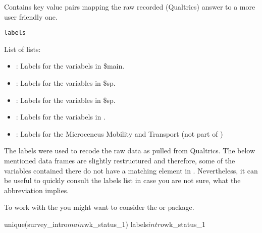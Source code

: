 %
\begin{Description}
Contains key value pairs mapping the raw recorded (Qualtrics) answer to a more
user friendly one.
\end{Description}
%
\begin{Usage}
\begin{verbatim}
labels
\end{verbatim}
\end{Usage}
%
\begin{Format}
List of lists:
\begin{itemize}

\item{} : Labels for the variabels in \$main.
\item{} : Labels for the variables in \$sp.
\item{} : Labels for the variables in \$sp.
\item{} : Labels for the variabels in .
\item{} : Labels for the Microcencus Mobility and Transport (not part of )

\end{itemize}

\end{Format}
%
\begin{Details}
The labels were used to recode the raw data as pulled from Qualtrics. The below
mentioned data frames are slightly restructured and therefore, some of the variables
contained there do not have a matching element in . Nevertheless, it
can be useful to quickly consult the labels list in case you are not sure, what
the abbreviation implies.

To work with the  you might want to consider the  \citep{Heimgartner:2024} or  \citep{Good:2024} package.
\end{Details}
%
\begin{References}
\end{References}
%
\begin{Examples}
\begin{ExampleCode}
unique(survey_intro$main$wk_status_1)
labels$intro$wk_status_1

\end{ExampleCode}
\end{Examples}

